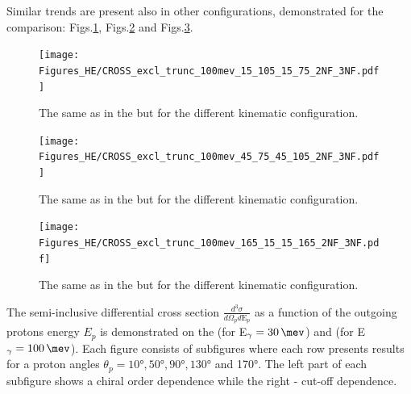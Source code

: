     Similar trends are present also in other configurations, demonstrated for the comparison:
    Figs.\ref{CROSS_HE_EXCL_15_105_15_75},
    Figs.\ref{CROSS_HE_EXCL_45_75_45_105} and
    Figs.\ref{CROSS_HE_EXCL_165_15_15_165}.

    
        \begin{figure}[h]
            \begin{center}
                \texttt{[image: Figures\_HE/CROSS\_excl\_trunc\_100mev\_15\_105\_15\_75\_2NF\_3NF.pdf]}
                \end{center}
                \caption{The same as in the  but for the different kinematic
                configuration.}
                \label{CROSS_HE_EXCL_15_105_15_75}
        \end{figure}




        \begin{figure}[h]
            \begin{center}
                \texttt{[image: Figures\_HE/CROSS\_excl\_trunc\_100mev\_45\_75\_45\_105\_2NF\_3NF.pdf]}
                \end{center}
                \caption{The same as in the  but for the different kinematic
                configuration.}
                \label{CROSS_HE_EXCL_45_75_45_105}
        \end{figure}


        \begin{figure}[h]
            \begin{center}
                \texttt{[image: Figures\_HE/CROSS\_excl\_trunc\_100mev\_165\_15\_15\_165\_2NF\_3NF.pdf]}
                \end{center}
                \caption{The same as in the  but for the different kinematic
                configuration.}
                \label{CROSS_HE_EXCL_165_15_15_165}
        \end{figure}


        The semi-inclusive differential cross section $\frac{d^3\sigma}{d\Omega_p d\text{E}_p}$
        as a function of the outgoing protons energy $E_p$ is demonstrated on the
         (for E$_\gamma = \SI{30}{\mev}$) and
         (for E$_\gamma = \SI{100}{\mev}$).
        Each figure consists of subfigures where each row presents results
        for a proton angles $\theta_p = \ang{10}, \ang{50}, \ang{90}, \ang{130}$ and \ang{170}.
        The left part of each subfigure shows a chiral order dependence while the right - cut-off dependence.
        
